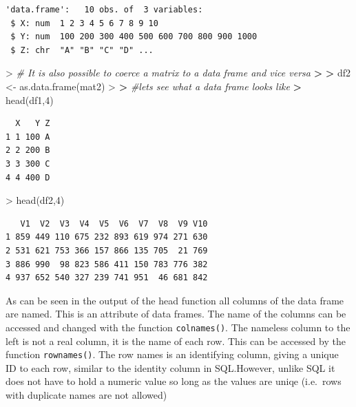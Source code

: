 \documentclass[
]{book}
\newenvironment{Shaded}{\begin{snugshade}}{\end{snugshade}}
\newcommand{\CommentTok}[1]{\textcolor[rgb]{0.56,0.35,0.01}{\textit{#1}}}
\newcommand{\DecValTok}[1]{\textcolor[rgb]{0.00,0.00,0.81}{#1}}
\newcommand{\ErrorTok}[1]{\textcolor[rgb]{0.64,0.00,0.00}{\textbf{#1}}}
\newcommand{\FunctionTok}[1]{\textcolor[rgb]{0.00,0.00,0.00}{#1}}
\newcommand{\NormalTok}[1]{#1}
\newcommand{\OtherTok}[1]{\textcolor[rgb]{0.56,0.35,0.01}{#1}}
\newcommand{\SpecialCharTok}[1]{\textcolor[rgb]{0.00,0.00,0.00}{#1}}
\theoremstyle{definition}
\theoremstyle{definition}
\theoremstyle{definition}
\theoremstyle{definition}
\theoremstyle{remark}
\begin{document}
\begin{verbatim}
'data.frame':   10 obs. of  3 variables:
 $ X: num  1 2 3 4 5 6 7 8 9 10
 $ Y: num  100 200 300 400 500 600 700 800 900 1000
 $ Z: chr  "A" "B" "C" "D" ...
\end{verbatim}

\begin{Shaded}
\begin{Highlighting}[]
\SpecialCharTok{\textgreater{}} \CommentTok{\# It is also possible to coerce a matrix to a data frame and vice versa}
\ErrorTok{\textgreater{}} 
\ErrorTok{\textgreater{}}\NormalTok{ df2 }\OtherTok{\textless{}{-}} \FunctionTok{as.data.frame}\NormalTok{(mat2)}
\SpecialCharTok{\textgreater{}} 
\ErrorTok{\textgreater{}} \CommentTok{\#let\textquotesingle{}s see what a data frame looks like}
\ErrorTok{\textgreater{}} \FunctionTok{head}\NormalTok{(df1,}\DecValTok{4}\NormalTok{)}
\end{Highlighting}
\end{Shaded}

\begin{verbatim}
  X   Y Z
1 1 100 A
2 2 200 B
3 3 300 C
4 4 400 D
\end{verbatim}

\begin{Shaded}
\begin{Highlighting}[]
\SpecialCharTok{\textgreater{}} \FunctionTok{head}\NormalTok{(df2,}\DecValTok{4}\NormalTok{)}
\end{Highlighting}
\end{Shaded}

\begin{verbatim}
   V1  V2  V3  V4  V5  V6  V7  V8  V9 V10
1 859 449 110 675 232 893 619 974 271 630
2 531 621 753 366 157 866 135 705  21 769
3 886 990  98 823 586 411 150 783 776 382
4 937 652 540 327 239 741 951  46 681 842
\end{verbatim}

As can be seen in the output of the head function all columns of the data frame are named.
This is an attribute of data frames. The name of the columns can be accessed and changed with the function \texttt{colnames()}.
The nameless column to the left is not a real column, it is the name of each row. This can be accessed by the function
\texttt{rownames()}. The row names is an identifying column, giving a unique ID to each row, similar to the identity column in
SQL.However, unlike SQL it does not have to hold a numeric value so long as the values are uniqe (i.e.~rows with duplicate
names are not allowed)
\end{document}

